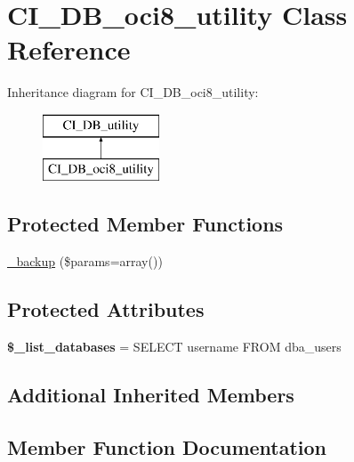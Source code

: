 \hypertarget{class_c_i___d_b__oci8__utility}{}\section{C\+I\+\_\+\+D\+B\+\_\+oci8\+\_\+utility Class Reference}
\label{class_c_i___d_b__oci8__utility}
Inheritance diagram for C\+I\+\_\+\+D\+B\+\_\+oci8\+\_\+utility\+:\begin{figure}[H]
\begin{center}
\leavevmode
\includegraphics[height=2.000000cm]{class_c_i___d_b__oci8__utility}
\end{center}
\end{figure}
\subsection*{Protected Member Functions}
\begin{DoxyCompactItemize}
\item 
\mbox{\hyperlink{class_c_i___d_b__oci8__utility_af60f65c2fd7b57f8e7e56c116403d7b3}{\+\_\+backup}} (\$params=array())
\end{DoxyCompactItemize}
\subsection*{Protected Attributes}
\begin{DoxyCompactItemize}
\item 
\mbox{\label{class_c_i___d_b__oci8__utility_a716efac66661c0710faf38bb61b7adaa}} 
{\bfseries \$\+\_\+list\+\_\+databases} = \textquotesingle{}S\+E\+L\+E\+CT username F\+R\+OM dba\+\_\+users\textquotesingle{}
\end{DoxyCompactItemize}
\subsection*{Additional Inherited Members}


\subsection{Member Function Documentation}
\mbox{\label{class_c_i___d_b__oci8__utility_af60f65c2fd7b57f8e7e56c116403d7b3}} 
